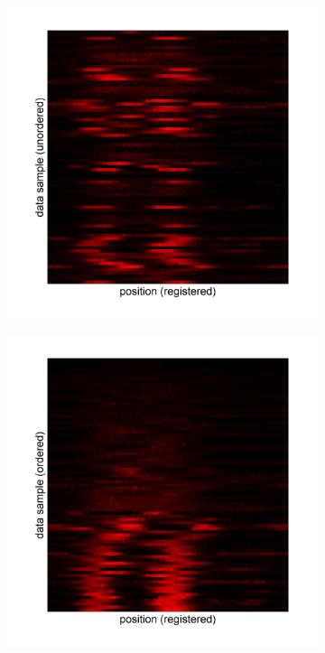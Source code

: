 \documentclass[11pt]{article}
\begin{document}
\begin{figure}
\begin{subfigure}{0.2\textwidth}
\caption{}
\label{subfig:1d_unaligned_unordered}
\end{subfigure}
\begin{subfigure}{0.2\textwidth}
\includegraphics[width=\textwidth]{registered_unordered_1d}
\caption{}
\label{subfig:1d_aligned_unordered}
\end{subfigure}
\begin{subfigure}{0.2\textwidth}
\includegraphics[width=\textwidth]{registered_ordered_1d}

\end{subfigure}
\end{figure}
\end{document}
